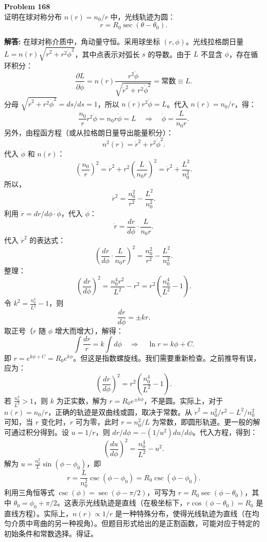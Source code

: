 \documentclass[12pt, a4paper, oneside]{ctexart}
\newenvironment{solution}{\par\noindent\textbf{解答:}\quad}{\par}
\begin{document}
\begin{mdframed}[backgroundcolor=gray!10, linewidth=0pt]
    \textbf{Problem 168} \\
    证明在球对称分布 $n(r) = n_0 / r$ 中，光线轨迹为圆：
    \[
    r = R_0 \sec(\theta - \theta_0).
    \]
\end{mdframed}
\begin{solution}
    在球对称介质中，角动量守恒。采用球坐标 $(r, \phi)$。光线拉格朗日量 $L = n(r) \sqrt{\dot{r}^2 + r^2 \dot{\phi}^2}$，其中点表示对弧长 $s$ 的导数。由于 $L$ 不显含 $\phi$，存在循环积分：
    \[
    \frac{\partial L}{\partial \dot{\phi}} = n(r) \frac{r^2 \dot{\phi}}{\sqrt{\dot{r}^2 + r^2 \dot{\phi}^2}} = \text{常数} \equiv L.
    \]
    分母 $\sqrt{\dot{r}^2 + r^2 \dot{\phi}^2} = ds/ds = 1$，所以 $n(r) r^2 \dot{\phi} = L$。代入 $n(r)=n_0/r$，得：
    \[
    \frac{n_0}{r} r^2 \dot{\phi} = n_0 r \dot{\phi} = L \quad \Rightarrow \quad \dot{\phi} = \frac{L}{n_0 r}.
    \]
    另外，由程函方程（或从拉格朗日量导出能量积分）：
    \[
    n^2(r) = \dot{r}^2 + r^2 \dot{\phi}^2.
    \]
    代入 $\dot{\phi}$ 和 $n(r)$：
    \[
    \left( \frac{n_0}{r} \right)^2 = \dot{r}^2 + r^2 \left( \frac{L}{n_0 r} \right)^2 = \dot{r}^2 + \frac{L^2}{n_0^2}.
    \]
    所以，
    \[
    \dot{r}^2 = \frac{n_0^2}{r^2} - \frac{L^2}{n_0^2}.
    \]
    利用 $\dot{r} = dr/d\phi \cdot \dot{\phi}$，代入 $\dot{\phi}$：
    \[
    \dot{r} = \frac{dr}{d\phi} \cdot \frac{L}{n_0 r}.
    \]
    代入 $\dot{r}^2$ 的表达式：
    \[
    \left( \frac{dr}{d\phi} \cdot \frac{L}{n_0 r} \right)^2 = \frac{n_0^2}{r^2} - \frac{L^2}{n_0^2}.
    \]
    整理：
    \[
    \left( \frac{dr}{d\phi} \right)^2 = \frac{n_0^4 r^2}{L^2} - r^2 = r^2 \left( \frac{n_0^4}{L^2} - 1 \right).
    \]
    令 $k^2 = \frac{n_0^4}{L^2} - 1$，则
    \[
    \frac{dr}{d\phi} = \pm k r.
    \]
    取正号（$r$ 随 $\phi$ 增大而增大），解得：
    \[
    \int \frac{dr}{r} = k \int d\phi \quad \Rightarrow \quad \ln r = k \phi + C.
    \]
    即 $r = e^{k\phi + C} = R_0 e^{k\phi}$。但这是指数螺旋线。我们需要重新检查。之前推导有误，应为：
    \[
    \left( \frac{dr}{d\phi} \right)^2 = r^2 \left( \frac{n_0^4}{L^2} - 1 \right).
    \]
    若 $\frac{n_0^4}{L^2} > 1$，则 $k$ 为正实数，解为 $r = R_0 e^{\pm k\phi}$，不是圆。实际上，对于 $n(r)=n_0/r$，正确的轨迹是双曲线或圆，取决于常数。从 $\dot{r}^2 = n_0^2/r^2 - L^2/n_0^2$ 可知，当 $r$ 变化时，$\dot{r}$ 可为零，此时 $r = n_0^2/L$ 为常数，即圆形轨道。更一般的解可通过积分得到。设 $u=1/r$，则 $dr/d\phi = - (1/u^2) du/d\phi$。代入方程，得到：
    \[
    \left( \frac{du}{d\phi} \right)^2 = \frac{n_0^4}{L^2} - u^2.
    \]
    解为 $u = \frac{n_0^2}{L} \sin(\phi - \phi_0)$，即
    \[
    r = \frac{L}{n_0^2} \csc(\phi - \phi_0) = R_0 \csc(\phi - \phi_0).
    \]
    利用三角恒等式 $\csc(\phi) = \sec(\phi - \pi/2)$，可写为 $r = R_0 \sec(\phi - \theta_0)$，其中 $\theta_0 = \phi_0 + \pi/2$。这表示光线轨迹是直线（在极坐标下，$r\cos(\phi-\theta_0)=R_0$ 是直线方程）。实际上，$n(r)\propto 1/r$ 是一种特殊分布，使得光线轨迹为直线（在均匀介质中弯曲的另一种视角）。但题目形式给出的是正割函数，可能对应于特定的初始条件和常数选择。得证。
\end{solution}
\end{document}
